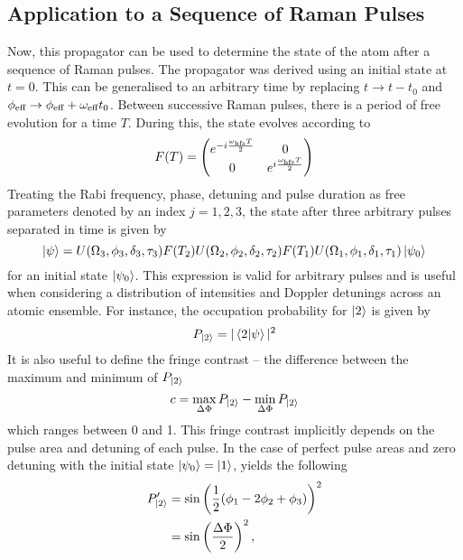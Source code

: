 \subsection{Application to a Sequence of Raman Pulses}
Now, this propagator can be used to determine the state of the atom
after a sequence of Raman pulses. The propagator was derived using an
initial state at $t=0$. This can be generalised to an arbitrary time
by replacing $t\rightarrow t-t_0$ and $\phi_\textnormal{eff} \rightarrow \phi_\textnormal{eff} +
\omega_\textnormal{eff} t_0$. Between successive Raman pulses, there is a period of
free evolution for a time $T$. During this, the state evolves
according to
\begin{equation}
  \label{eq:free_evolution}
  F(T) = \begin{pmatrix} e^{-i \frac{\omega_\textnormal{hfs} T}{2}} &0 \\
  0 & e^{i \frac{\omega_\textnormal{hfs} T}{2}}\end{pmatrix}
\end{equation}
Treating the Rabi frequency, phase, detuning and pulse duration as free
parameters denoted by an index $j=1,2,3$, the state after three arbitrary pulses separated in time
is given by
\begin{equation}
  \label{eq:general_state}
  \ket{\psi} = U(\Omega_3,\phi_3,\delta_3,\tau_3) F(T_2)
  U(\Omega_2,\phi_2,\delta_2,\tau_2) F(T_1)
  U(\Omega_1,\phi_1,\delta_1,\tau_1)
  \ket{\psi_0}
\end{equation}
for an initial state $\ket{\psi_0}$. This expression is valid for
arbitrary pulses and is useful when considering a
distribution of intensities and Doppler detunings across an atomic
ensemble. For instance, the occupation probability for $\ket{2}$ is
given by 
\begin{equation}
  \label{eq:occ_prob}
  P_{\ket{2}} = |\braket{2|\psi}|^2
\end{equation}
It is also useful to define the fringe contrast -- the difference
between the maximum and minimum of $P_{\ket{2}}$
\begin{equation}
  \label{eq:fringe_contrast}
  c = \max_{\Delta \Phi} P_{\ket{2}} -  \min_{\Delta \Phi} P_{\ket{2}} 
\end{equation}
which ranges between 0 and 1. This fringe contrast implicitly depends
on the pulse area and detuning of each pulse. In the case of perfect pulse areas and zero
detuning with the initial state $\ket{\psi_0} =
\ket{1}$,  yields the following
\begin{align}
  \label{eq:state_simp}
  P'_{\ket{2}} &= \sin \left(\frac{1}{2} (\phi_1-2
  \phi_2+\phi_3)\right)^2 \nonumber \\
  &= \sin\left(\frac{\Delta \Phi}{2}\right)^2,
\end{align}
